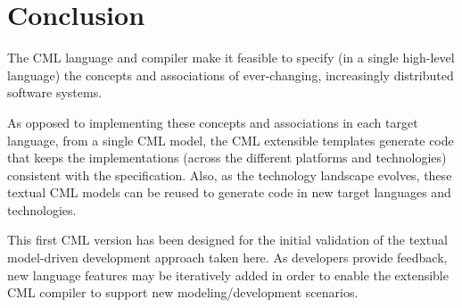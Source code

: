 \section{Conclusion}\label{sec:conclusion}

The CML language and compiler make it feasible to specify
(in a single high-level language)
the concepts and associations of ever-changing,
increasingly distributed software systems.

As opposed to implementing these concepts and associations in each target language,
from a single CML model,
the CML extensible templates generate code that
keeps the implementations 
(across the different platforms and technologies) 
consistent with the specification.
Also, as the technology landscape evolves,
these textual CML models can be reused to generate code in new target languages and technologies.

This first CML version has been designed for the initial validation of the textual model-driven development approach taken here.
As developers provide feedback,
new language features may be iteratively added in order to enable the extensible CML compiler to support new modeling/development scenarios.